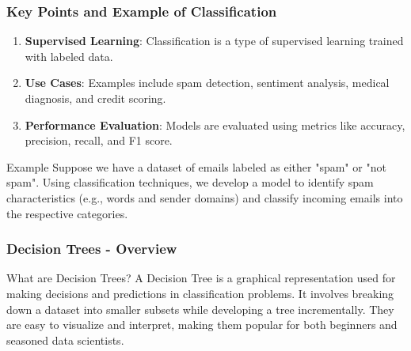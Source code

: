 \documentclass[aspectratio=169]{beamer}
\begin{document}
\begin{frame}[fragile]
    \frametitle{Key Points and Example of Classification}
    \begin{enumerate}
        \item \textbf{Supervised Learning}: Classification is a type of supervised learning trained with labeled data.
        \item \textbf{Use Cases}: Examples include spam detection, sentiment analysis, medical diagnosis, and credit scoring.
        \item \textbf{Performance Evaluation}: Models are evaluated using metrics like accuracy, precision, recall, and F1 score.
    \end{enumerate}
    
    \begin{block}{Example}
        Suppose we have a dataset of emails labeled as either "spam" or "not spam". Using classification techniques, we develop a model to identify spam characteristics (e.g., words and sender domains) and classify incoming emails into the respective categories.
    \end{block}
\end{frame}

\begin{frame}[fragile]
    \frametitle{Decision Trees - Overview}
    
    \begin{block}{What are Decision Trees?}
        A Decision Tree is a graphical representation used for making decisions and predictions in classification problems. It involves breaking down a dataset into smaller subsets while developing a tree incrementally. They are easy to visualize and interpret, making them popular for both beginners and seasoned data scientists.
    \end{block}
\end{frame}
\end{document}

